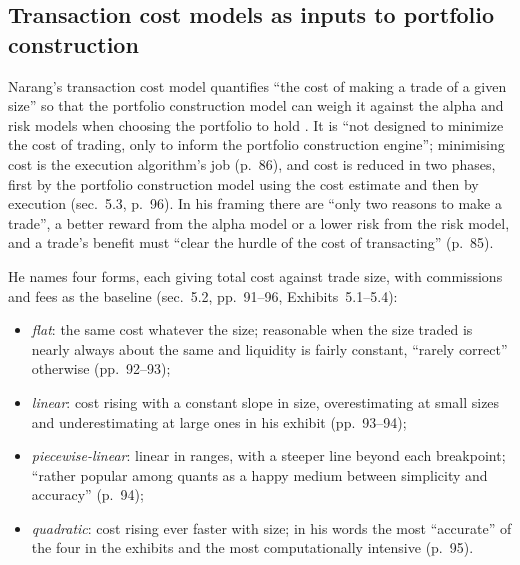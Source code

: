 \subsection{Transaction cost models as inputs to portfolio construction}

\begin{qfmodel}\label{mod:portfolio-transaction-cost-function}
 Narang's transaction cost model quantifies ``the cost of making a trade of a given size'' so that the portfolio construction model can weigh it against the alpha and risk models when choosing the portfolio to hold \citep[chap.~5, ``Transaction Cost Models'', p.~85]{s7-narang}. It is ``not designed to minimize the cost of trading, only to inform the portfolio construction engine''; minimising cost is the execution algorithm's job (p.~86), and cost is reduced in two phases, first by the portfolio construction model using the cost estimate and then by execution (sec.~5.3, p.~96). In his framing there are ``only two reasons to make a trade'', a better reward from the alpha model or a lower risk from the risk model, and a trade's benefit must ``clear the hurdle of the cost of transacting'' (p.~85).

He names four forms, each giving total cost against trade size, with commissions and fees as the baseline (sec.~5.2, pp.~91--96, Exhibits~5.1--5.4):
\begin{itemize}
\item \emph{flat}: the same cost whatever the size; reasonable when the size traded is nearly always about the same and liquidity is fairly constant, ``rarely correct'' otherwise (pp.~92--93);
\item \emph{linear}: cost rising with a constant slope in size, overestimating at small sizes and underestimating at large ones in his exhibit (pp.~93--94);
\item \emph{piecewise-linear}: linear in ranges, with a steeper line beyond each breakpoint; ``rather popular among quants as a happy medium between simplicity and accuracy'' (p.~94);
\item \emph{quadratic}: cost rising ever faster with size; in his words the most ``accurate'' of the four in the exhibits and the most computationally intensive (p.~95).
\end{itemize}


\end{qfmodel}
